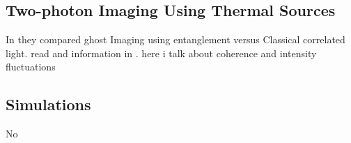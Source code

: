 \subsection{Two-photon Imaging Using Thermal Sources}

In \cite{thermal} they compared ghost Imaging using entanglement versus Classical correlated light. read and information in \cite{thermalAlejandra}. here i talk about coherence and intensity fluctuations \cite{intensity}

\subsection{Simulations}

No\cite{simulated}



